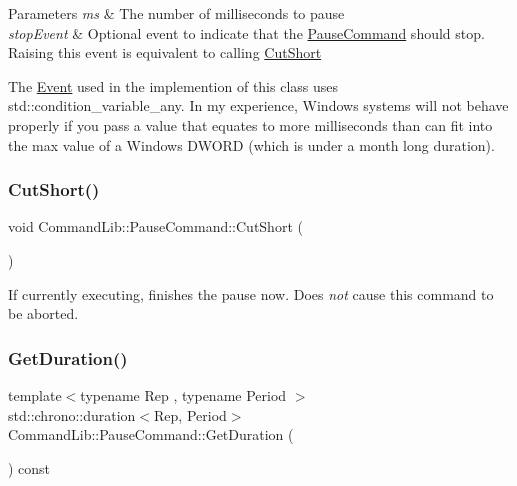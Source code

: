 \begin{DoxyParams}{Parameters}
{\em ms} & The number of milliseconds to pause\\
\hline
{\em stop\+Event} & Optional event to indicate that the \mbox{\hyperlink{class_command_lib_1_1_pause_command}{Pause\+Command}} should stop. Raising this event is equivalent to calling \mbox{\hyperlink{class_command_lib_1_1_pause_command_a1a02c8ebd44bd32cdc72731d2a16d232}{Cut\+Short}} \\
\hline
\end{DoxyParams}


The \mbox{\hyperlink{class_command_lib_1_1_event}{Event}} used in the implemention of this class uses std\+::condition\+\_\+variable\+\_\+any. In my experience, Windows systems will not behave properly if you pass a value that equates to more milliseconds than can fit into the max value of a Windows D\+W\+O\+RD (which is under a month long duration). \mbox{\label{class_command_lib_1_1_pause_command_a1a02c8ebd44bd32cdc72731d2a16d232}} 
\subsubsection{\texorpdfstring{Cut\+Short()}{CutShort()}}
{\footnotesize\ttfamily void Command\+Lib\+::\+Pause\+Command\+::\+Cut\+Short (\begin{DoxyParamCaption}{ }\end{DoxyParamCaption})}



If currently executing, finishes the pause now. Does {\itshape not} cause this command to be aborted. 

\mbox{\label{class_command_lib_1_1_pause_command_aa6bf4dfa9880d58f4995090d0cd6859c}} 
\subsubsection{\texorpdfstring{Get\+Duration()}{GetDuration()}}
{\footnotesize\ttfamily template$<$typename Rep , typename Period $>$ \\
std\+::chrono\+::duration$<$Rep, Period$>$ Command\+Lib\+::\+Pause\+Command\+::\+Get\+Duration (\begin{DoxyParamCaption}{ }\end{DoxyParamCaption}) const\hspace{0.3cm}{\ttfamily [inline]}}



